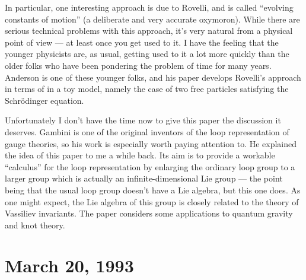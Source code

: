 \documentclass[12pt]{article}
\def\tightlist{}
\renewcommand{\texttt}[1]{%
  \begingroup
  \ttfamily
  \begingroup\lccode`~=`/\lowercase{\endgroup\def~}{/\discretionary{}{}{}}%
  \begingroup\lccode`~=`[\lowercase{\endgroup\def~}{[\discretionary{}{}{}}%
  \begingroup\lccode`~=`.\lowercase{\endgroup\def~}{.\discretionary{}{}{}}%
  \catcode`/=\active\catcode`[=\active\catcode`.=\active
  \scantokens{#1\noexpand}%
  \endgroup
}
\begin{document}

In particular, one interesting approach is due to Rovelli, and is called
``evolving constants of motion'' (a deliberate and very accurate
oxymoron). While there are serious technical problems with this
approach, it's very natural from a physical point of view --- at least
once you get used to it. I have the feeling that the younger physicists
are, as usual, getting used to it a lot more quickly than the older
folks who have been pondering the problem of time for many years.
Anderson is one of these younger folks, and his paper develops Rovelli's
approach in terms of in a toy model, namely the case of two free
particles satisfying the Schr\"odinger equation.


Unfortunately I don't have the time now to give this paper the
discussion it deserves. Gambini is one of the original inventors of the
loop representation of gauge theories, so his work is especially worth
paying attention to. He explained the idea of this paper to me a while
back. Its aim is to provide a workable ``calculus'' for the loop
representation by enlarging the ordinary loop group to a larger group
which is actually an infinite-dimensional Lie group --- the point being
that the usual loop group doesn't have a Lie algebra, but this one does.
As one might expect, the Lie algebra of this group is closely related to
the theory of Vassiliev invariants. The paper considers some
applications to quantum gravity and knot theory.



\hypertarget{week10}{%
\section{March 20, 1993}\label{week10}}
\end{document}
